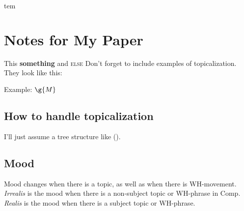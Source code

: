 \documentclass[12pt]{article}
\begin{document}
tem

\section*{Notes for My Paper}

This \textbf{something} and \textsc{else}
Don't forget to include examples of topicalization.
They look like this:

Example: $\g{M}$

{\small
{}
}

\subsection*{How to handle topicalization}

I'll just assume a tree structure like ().

{\small
{}
}

\subsection*{Mood}

Mood changes when there is a topic, as well as when
there is WH-movement.  \emph{Irrealis} is the mood when
there is a non-subject topic or WH-phrase in Comp.
\emph{Realis} is the mood when there is a subject topic
or WH-phrase.
\end{document}
